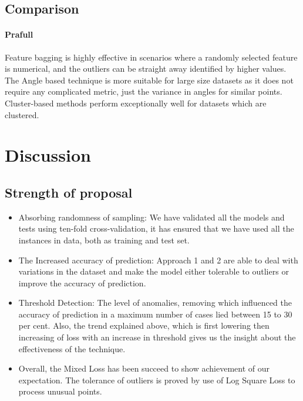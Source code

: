 \documentclass[runningheads]{llncs}
\begin{document}
\subsection{Comparison}
\paragraph{Prafull} Feature bagging is highly effective in scenarios where a randomly selected feature is numerical, and the outliers can be straight away identified by higher values. The Angle based technique is more suitable for large size datasets as it does not require any complicated metric, just the variance in angles for similar points. Cluster-based methods perform exceptionally well for datasets which are clustered.

\section{Discussion}
\subsection{Strength of proposal}
\begin{itemize}
    \item Absorbing randomness of sampling: We have validated all the models and tests using ten-fold cross-validation, it has ensured that we have used all the instances in data, both as training and test set.
    \item The Increased accuracy of prediction:
    Approach 1 and 2 are able to deal with variations in the dataset and make the model either tolerable to outliers or improve the accuracy of prediction.
    \item Threshold Detection: The level of anomalies, removing which influenced the accuracy of prediction in a maximum number of cases lied between 15 to 30 per cent. Also, the trend explained above, which is first lowering then increasing of loss with an increase in threshold gives us the insight about the effectiveness of the technique.
    \item Overall, the Mixed Loss has been succeed to show achievement of our expectation. The tolerance of outliers is proved by use of Log Square Loss to process unusual points.
\end{itemize}
\end{document}
